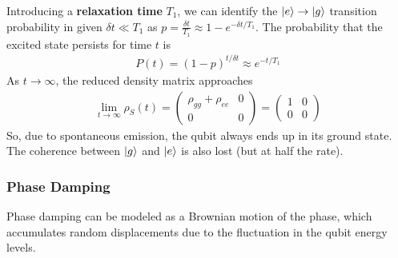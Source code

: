 Introducing a \textbf{relaxation time} $T_1$, we can identify the $\ket{e} \rightarrow \ket{g}$ transition probability in given $\delta t\ll T_1$ as $p=\frac{\delta t}{T_1} \approx 1-e^{-\delta t/T_1}$. The probability that the excited state persists for time $t$ is
\begin{align*}
    P(t)=(1-p)^{t/\delta t}\approx e^{-t/T_1}
\end{align*}
As $t\rightarrow \infty$, the reduced density matrix approaches
\begin{align*}
    \lim_{t\rightarrow \infty} \rho_S(t)=\begin{pmatrix}
        \rho_{gg}+\rho_{ee}& 0\\0 & 0 
    \end{pmatrix}=\begin{pmatrix}
        1 & 0 \\ 0 & 0
    \end{pmatrix}
\end{align*}
So, due to spontaneous emission, the qubit always ends up in its ground state. The coherence between $\ket{g}$ and $\ket{e}$ is also lost (but at half the rate).

\subsubsection{Phase Damping}
Phase damping can be modeled as a Brownian motion of the phase, which accumulates random displacements due to the fluctuation in the qubit energy levels.

